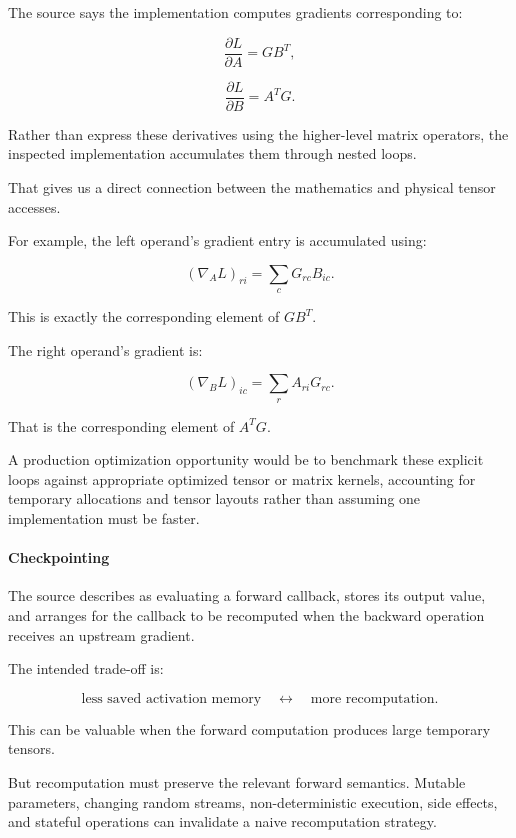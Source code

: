 The source says the  implementation computes gradients corresponding to:

\[
\frac{\partial L}{\partial A}=GB^T,
\]

\[
\frac{\partial L}{\partial B}=A^TG.
\]

Rather than express these derivatives using the higher-level matrix operators, the inspected implementation accumulates them through nested loops.

That gives us a direct connection between the mathematics and physical tensor accesses.

For example, the left operand's gradient entry is accumulated using:

\[
(\nabla_A L)_{ri} = \sum_cG_{rc}B_{ic}.
\]

This is exactly the corresponding element of \(GB^T\).

The right operand's gradient is:

\[
(\nabla_B L)_{ic} = \sum_rA_{ri}G_{rc}.
\]

That is the corresponding element of \(A^TG\).

A production optimization opportunity would be to benchmark these explicit loops against appropriate optimized tensor or matrix kernels, accounting for temporary allocations and tensor layouts rather than assuming one implementation must be faster.

\paragraph{Checkpointing}\label{02-foundations-ii-ch022-checkpointing}

\hypertarget{02-foundations-ii-ch022-checkpointing}{}

The source describes  as evaluating a forward callback, stores its output value, and arranges for the callback to be recomputed when the backward operation receives an upstream gradient.

The intended trade-off is:

\[
\text{less saved activation memory} \quad\longleftrightarrow\quad \text{more recomputation}.
\]

This can be valuable when the forward computation produces large temporary tensors.

But recomputation must preserve the relevant forward semantics. Mutable parameters, changing random streams, non-deterministic execution, side effects, and stateful operations can invalidate a naive recomputation strategy.

